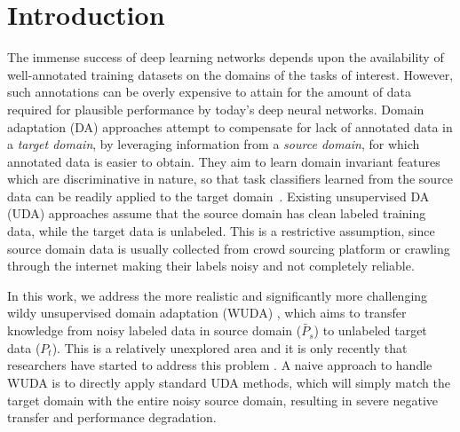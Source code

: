 \section{Introduction}
The immense success of deep learning networks depends upon the availability of well-annotated training datasets on the domains of the tasks of interest. 
However, such annotations can be overly expensive to attain for the amount of data required for plausible performance by today’s deep neural networks. 
Domain adaptation (DA) approaches attempt to compensate for lack of annotated data in a \textit{target domain}, by leveraging information from a \textit{source domain}, for which annotated data is easier to obtain. 
They aim to learn domain invariant features which are discriminative in nature, so that task classifiers learned from the source data can be readily applied to the target domain~\cite{uda,dann,ctc,ltdan,atda,saito2017maximum}.
Existing unsupervised DA (UDA) approaches assume that the source domain has clean labeled training data, while the target data is unlabeled. 
This is a restrictive assumption, since source domain data is usually collected from crowd sourcing platform or crawling through the internet making their labels noisy and not completely reliable.

In this work, we address the more realistic and significantly more challenging wildy unsupervised domain adaptation (WUDA) \cite{tcl,butterfly}, which aims to transfer knowledge from noisy labeled data in source domain ($\tilde{P_s}$) to unlabeled target data ($P_t$).
This is a relatively unexplored area and it is only recently that researchers have started to address this problem \cite{tcl,butterfly}.
A naive approach to handle WUDA is to directly apply standard UDA methods, which will simply match the target domain with the entire noisy
source domain, resulting in severe negative transfer and performance degradation. 


